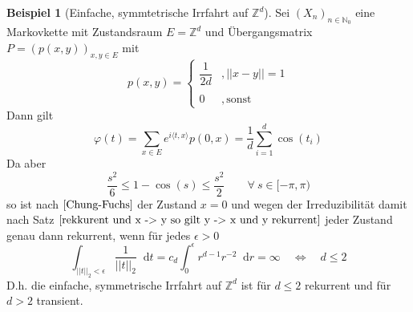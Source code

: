 \documentclass[a4paper,12pt]{scrartcl}
\theoremstyle{definition}
\newtheorem{bsp}{Beispiel}[section]
\newcommand*\diff{\mathop{}\!\mathrm{d}}
\begin{document}
\begin{bsp}[Einfache, symmtetrische Irrfahrt auf $\mathbb{Z}^{d}$]
Sei $(X_{n})_{n \in \mathbb{N}_{0}}$ eine Markovkette mit Zustandsraum $E= \mathbb{Z}^{d}$ und Übergangsmatrix $P = (p(x,y))_{x,y \in E}$ mit
\begin{equation*}
p(x,y)=
\begin{cases}
\dfrac{1}{2d} & , \vert \vert x - y \vert \vert = 1\\
& \\
0 & , \mathrm{sonst}
\end{cases}
\end{equation*}
Dann gilt 
\begin{equation*}
\varphi (t) = \sum_{x \in E} e^{i \langle t,x \rangle} p(0,x) = \dfrac{1}{d} \sum_{i=1}^{d} \cos(t_{i})
\end{equation*}
Da aber 
\begin{equation*}
\dfrac{s^{2}}{6} \leq 1 - \cos(s) \leq \dfrac{s^{2}}{2} \qquad \forall \: s \in [- \pi, \pi)
\end{equation*}
so ist nach $\ref{Chung-Fuchs}$ der Zustand $x=0$ und wegen der Irreduzibilität damit nach Satz $\ref{rekkurent und x -> y so gilt y -> x und y rekurrent}$ jeder Zustand genau dann rekurrent, wenn für jedes $\epsilon > 0$
\begin{equation*}
\int_{{\vert \vert t \vert \vert}_{2} < \epsilon} \dfrac{1}{{\vert \vert t \vert \vert}_{2}} \diff t = c_{d} \int_{0}^{\epsilon} r^{d-1} r^{-2} \diff r = \infty \quad \Leftrightarrow \quad d \leq 2
\end{equation*}
D.h. die einfache, symmetrische Irrfahrt auf $\mathbb{Z}^{d}$ ist für $d \leq 2$ rekurrent und für $d>2$ transient.
\end{bsp}
\end{document}

